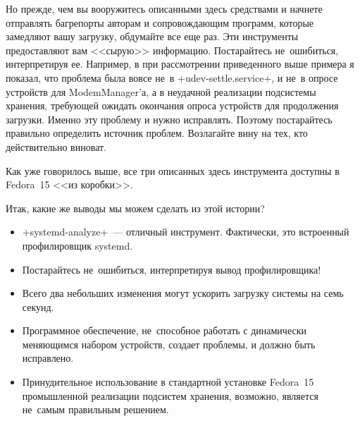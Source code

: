 \documentclass[10pt,oneside,a4paper]{article}
\begin{document}
Но прежде, чем вы вооружитесь описанными здесь средствами и начнете
отправлять багрепорты авторам и сопровождающим программ, которые замедляют вашу
загрузку, обдумайте все еще раз. Эти инструменты предоставляют вам <<сырую>>
информацию. Постарайтесь не~ошибиться, интерпретируя ее. Например, в
при рассмотрении приведенного выше примера я показал, что проблема была вовсе
не~в +udev-settle.service+, и не~в опросе устройств для ModemManager'а, а в 
неудачной реализации подсистемы хранения, требующей ожидать окончания опроса
устройств для продолжения загрузки. Именно эту проблему и нужно исправлять.
Поэтому постарайтесь правильно определить источник проблем. Возлагайте вину на
тех, кто действительно виноват.

Как уже говорилось выше, все три описанных здесь инструмента доступны в
Fedora~15 <<из коробки>>.

Итак, какие же выводы мы можем сделать из этой истории?
\begin{itemize}
	\item +systemd-analyze+~--- отличный инструмент. Фактически, это
		встроенный профилировщик systemd.
	\item Постарайтесь не~ошибиться, интерпретируя вывод профилировщика!
	\item Всего два небольших изменения могут ускорить загрузку системы на
		семь секунд.
	\item Программное обеспечение, не~способное работать с динамически
		меняющимся набором устройств, создает проблемы, и должно быть
		исправлено.
	\item Принудительное использование в стандартной установке Fedora~15
		промышленной реализации подсистем хранения, возможно, является
		не~самым правильным решением.
\end{itemize}
\end{document}
